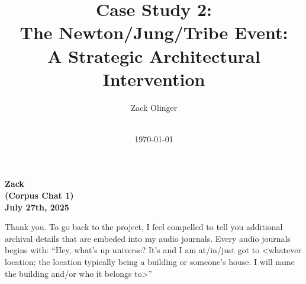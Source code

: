 \documentclass{article}
\newcommand{\docTitle}{Case Study 2: \\The Newton/Jung/Tribe Event: \\A Strategic Architectural Intervention}
\newcommand{\docAuthor}{Zack Olinger}
\newcommand{\docVersion}{\csNewtonJungTribeVersion}
\begin{document}

\pagestyle{frontmatterstyle}


\begin{titlepage}
    \title{\docTitle}
    \author{\docAuthor}
    \date{
        \docVersion \\
        \vspace{1em}
        \today
    }
    \maketitle
    \thispagestyle{empty}

    \begin{abstract}
        \csNewtonJungTribeAbstract
    \end{abstract}

\end{titlepage}


\licensepage


\fancypagestyle{plain}{
    \fancyhf{}
    \fancyfoot[L]{\docVersion}
    \fancyfoot[C]{\href{\licenseURL}{\licenseText}}
      \fancyfoot[R]{Page \thepage\ of \pageref*{LastFrontMatterPage}}
    \renewcommand{\headrulewidth}{0pt}
    \renewcommand{\footrulewidth}{0.4pt}
}


\tableofcontents
\label{LastFrontMatterPage}


\clearpage
{}
{}
\pagestyle{mainmatterstyle}


\begin{center}
\textbf{Zack}\\
\textbf{(Corpus Chat 1)}\\
\textbf{July 27th, 2025}
\end{center}

Thank you. To go back to the project, I feel compelled to tell you additional archival details that are embeded into my audio journals. Every audio journals begins with: ``Hey, what's up universe? It's and I am at/in/just got to \textless whatever location; the location typically being a building or someone's house. I will name the building and/or who it belongs to\textgreater{}''
\end{document}
